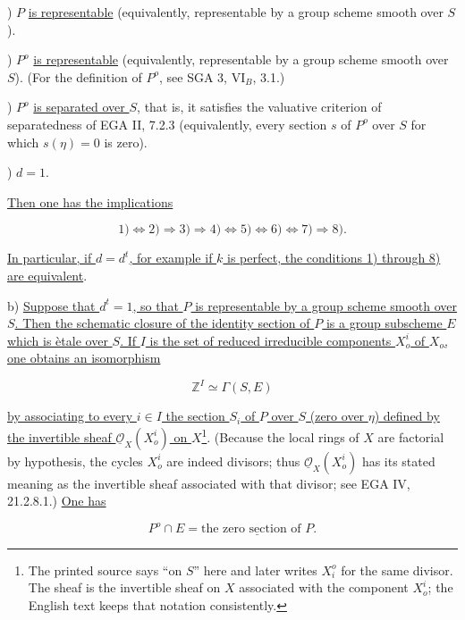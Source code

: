 \smallskip
{}) $P$ \underline{is representable} (equivalently, representable by a
group scheme smooth over $S$).

\smallskip
{}) $P^o$ \underline{is representable} (equivalently, representable by a
group scheme smooth over $S$). (For the definition of $P^o$, see SGA 3,
$\mathrm{VI}_B$, 3.1.)

\smallskip
{}) $P^o$ \underline{is separated over $S$}, that is, it satisfies the
valuative criterion of separatedness of EGA II, 7.2.3 (equivalently,
every section $s$ of $P^o$ over $S$ for which $s(\eta)=0$ is zero).

\smallskip
{}) $d=1$.

\smallskip
\noindent
\underline{Then one has the implications}

\begin{equation}\tag{12.1.4}
 1)\Longleftrightarrow2)\Longrightarrow3)\Longrightarrow4)
 \Longleftrightarrow5)\Longleftrightarrow6)\Longleftrightarrow7)
 \Longrightarrow8).
\end{equation}

\noindent
\underline{In particular, if $d=d^t$, for example if $k$ is perfect, the
conditions 1) through 8) are equivalent}.

\medskip
\noindent
b) \underline{Suppose that $d^t=1$, so that $P$ is representable by a
group scheme smooth over $S$. Then the schematic closure of the identity
section of $P$ is a group subscheme $E$ which is \`etale over $S$. If $I$
is the set of reduced irreducible components $X_o^i$ of $X_o$, one obtains
an isomorphism}

\begin{equation}\tag{12.1.5}
 \mathbb Z^I\simeq\Gamma(S,E)
\end{equation}

\noindent
\underline{by associating to every $i\in I$ the section $S_i$ of $P$ over
$S$ (zero over $\eta$) defined by the invertible sheaf
$\underline{\mathcal O}_X(X_o^i)$ on $X$}\footnote{The printed source says
``on $S$'' here and later writes $X_i^o$ for the same divisor. The sheaf is
the invertible sheaf on $X$ associated with the component $X_o^i$; the
English text keeps that notation consistently.}. (Because the local rings of $X$
are factorial by hypothesis, the cycles $X_o^i$ are indeed divisors; thus
$\underline{\mathcal O}_X(X_o^i)$ has its stated meaning as the invertible
sheaf associated with that divisor; see EGA IV, 21.2.8.1.) \underline{One
has}

\begin{equation}\tag{12.1.6}
 P^o\cap E=\underline{\text{the zero section of }P}.
\end{equation}

